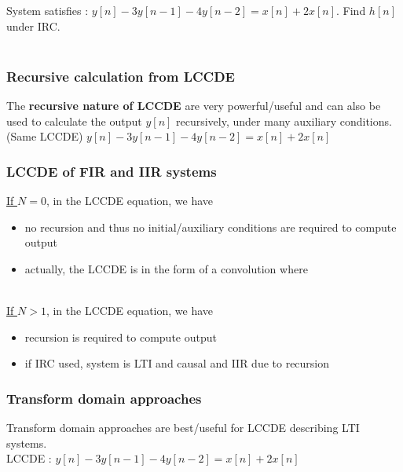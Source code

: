 \documentclass[10pt,a4paper,report]{report}       %
\begin{document}
\ex System satisfies : $y[n]-3y[n-1]-4y[n-2] = x[n]+2x[n]$. Find $h[n]$ under IRC.\\
\vspace{3cm}\\
\vspace{3cm}

\subsubsection{Recursive calculation from LCCDE}
The \textbf{recursive nature of LCCDE} are very powerful/useful and can also be used to calculate the output $y[n]$ recursively, under many auxiliary conditions.\\
\ex (Same LCCDE) $y[n]-3y[n-1]-4y[n-2] = x[n]+2x[n]$\\
\vspace{4cm}

\subsubsection{LCCDE of FIR and IIR systems}
\underline{If $N=0$}, in the LCCDE equation, we have\\
\begin{itemize}
  \item no recursion and thus no initial/auxiliary conditions are required to compute output
  \item actually, the LCCDE is in the form of a convolution where\\ \\
\end{itemize}
\underline{If $N>1$}, in the LCCDE equation, we have\\
\begin{itemize}
  \item recursion is required to compute output
  \item if IRC used, system is LTI and causal and IIR due to recursion
\end{itemize}

\subsubsection{Transform domain approaches}
Transform domain approaches are best/useful for LCCDE describing LTI systems.\\
\ex LCCDE : $y[n]-3y[n-1]-4y[n-2] = x[n]+2x[n]$\\
\vspace{4cm}
\end{document}
